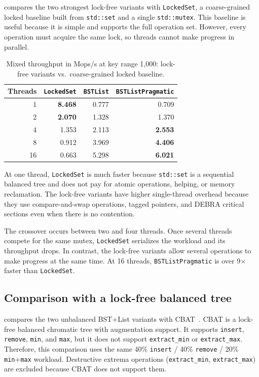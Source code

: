 \documentclass[a4paper,11pt]{article}
\newcommand{\code}[1]{\texttt{#1}}
\begin{document}
 compares the two strongest lock-free variants with \code{LockedSet}, a coarse-grained locked baseline built from \code{std::set} and a single \code{std::mutex}. This baseline is useful because it is simple and supports the full operation set. However, every operation must acquire the same lock, so threads cannot make progress in parallel.

\begin{table}[H]
\centering
\caption{Mixed throughput in Mops/s at key range 1,000: lock-free variants vs.\ coarse-grained locked baseline.}
\label{tab:locked-comparison}
\begin{tabular}{r r r r}
\toprule
Threads & \code{LockedSet} & \code{BSTList} & \code{BSTListPragmatic} \\
\midrule
 1 & \textbf{8.468} & 0.777 & 0.709 \\
 2 & \textbf{2.070} & 1.328 & 1.370 \\
 4 & 1.353 & 2.113 & \textbf{2.553} \\
 8 & 0.912 & 3.969 & \textbf{4.406} \\
16 & 0.663 & 5.298 & \textbf{6.021} \\
\bottomrule
\end{tabular}
\end{table}

At one thread, \code{LockedSet} is much faster because \code{std::set} is a sequential balanced tree and does not pay for atomic operations, helping, or memory reclamation. The lock-free variants have higher single-thread overhead because they use compare-and-swap operations, tagged pointers, and DEBRA critical sections even when there is no contention.

The crossover occurs between two and four threads. Once several threads compete for the same mutex, \code{LockedSet} serializes the workload and its throughput drops. In contrast, the lock-free variants allow several operations to make progress at the same time. At 16 threads, \code{BSTListPragmatic} is over 9$\times$ faster than \code{LockedSet}.

\subsection{Comparison with a lock-free balanced tree}
\label{sec:cbat-comparison}

 compares the two unbalanced BST+List variants with CBAT~\cite{wrench2026cbat}. CBAT is a lock-free balanced chromatic tree with augmentation support. It supports \code{insert}, \code{remove}, \code{min}, and \code{max}, but it does not support \code{extract\_min} or \code{extract\_max}. Therefore, this comparison uses the same 40\% \code{insert} / 40\% \code{remove} / 20\% \code{min}+\code{max} workload. Destructive extrema operations (\code{extract\_min}, \code{extract\_max}) are excluded because CBAT does not support them.
\end{document}
